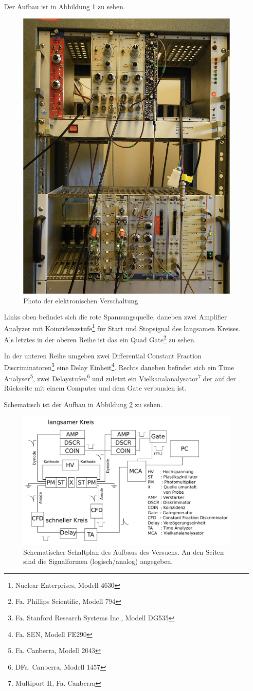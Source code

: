 \documentclass[a4paper,12pt]{article}
\begin{document}
Der Aufbau ist in Abbildung \ref{fig:aufbau} zu sehen.
\begin{figure}[htb]
		\centering
		\includegraphics[width=.5\textwidth]{aufbau.jpg}
		\caption{Photo der elektronischen Verschaltung}
		\label{fig:aufbau}
\end{figure}

Links oben befindet sich die rote Spannungsquelle, daneben zwei Amplifier Analyzer mit Koinzidenzstufe\footnote{Nuclear Enterprises, Modell 4630} für Start und Stopsignal des langsamen Kreises.
Als letztes in der oberen Reihe ist das ein Quad Gate\footnote{Fa. Phillips Scientific, Modell 794} zu sehen.

In der unteren Reihe umgeben zwei Differential Constant Fraction Discriminatoren\footnote{Fa. Stanford Research Systems Inc., Modell DG535} eine Delay Einheit\footnote{Fa. SEN, Modell FE290}.
Rechts daneben befindet sich ein Time Analyser\footnote{Fa. Canberra, Modell 2043}, zwei Delaystufen\footnote{DFa. Canberra, Modell 1457} und zuletzt ein Vielkanalanalysator\footnote{Multiport II, Fa. Canberra} der auf der Rückseite mit einem Computer und dem Gate verbunden ist.

Schematisch ist der Aufbau in Abbildung \ref{fig:schaltplan} zu sehen.
\begin{figure}[htb]
		\centering
		\includegraphics[width=1.0\textwidth]{Schaltplan_custom.pdf}
		\caption{Schematischer Schaltplan des Aufbaus des Versuchs.
		An den Seiten sind die Signalformen (logisch/analog) angegeben.}
		\label{fig:schaltplan}
\end{figure}
\end{document}
